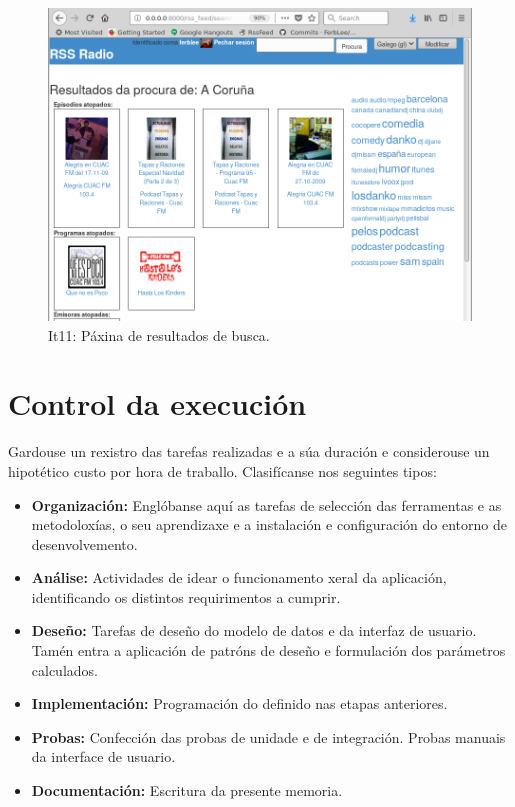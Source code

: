 \begin{figure}[H]
	\centering
	\includegraphics[scale=0.45,keepaspectratio=true]{./images/procura_final.png}
	\caption{It11: Páxina de resultados de busca.}
	\label{fig:procura_final}
\end{figure}

\pagebreak

\section{Control da execución}

Gardouse un rexistro das tarefas realizadas e a súa duración e considerouse un hipotético custo por hora de traballo. Clasifícanse nos seguintes tipos:

\begin{itemize}
	\item \textbf{Organización:} Englóbanse aquí as tarefas de selección das ferramentas e as metodoloxías, o seu aprendizaxe e a instalación e configuración do entorno de desenvolvemento. 
	\item \textbf{Análise:} Actividades de idear o funcionamento xeral da aplicación, identificando os distintos requirimentos a cumprir.
	\item \textbf{Deseño:} Tarefas de deseño do modelo de datos e da interfaz de usuario. Tamén entra a aplicación de patróns de deseño e formulación dos parámetros calculados. 
	\item \textbf{Implementación:} Programación do definido nas etapas anteriores. 
	\item \textbf{Probas:} Confección das probas de unidade e de integración. Probas manuais da interface de usuario.
	\item \textbf{Documentación:} Escritura da presente memoria.
\end{itemize} 

